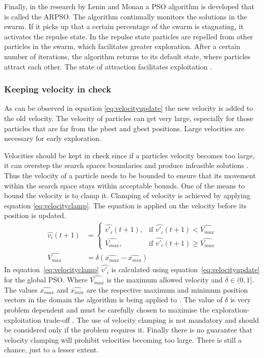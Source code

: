 Finally, in the research by Lenin and Monan a \gls{PSO} algorithm is developed that is called the \gls{ARPSO}. The algorithm continually monitors the solutions in the swarm. If it picks up that a certain percentage of the swarm is stagnating, it activates the repulse state. In the repulse state particles are repelled from other particles in the swarm, which facilitates greater exploration. After a certain number of iterations, the algorithm returns to its default state, where particles attract each other. The state of attraction facilitates exploitation \cite{PSOAttractRepulse}.
\subsubsection{Keeping velocity in check}
As can be observed in equation \ref{eq:velocityupdate} the new velocity is added to the old velocity. The velocity of particles can get very large, especially for those particles that are far from the pbest and gbest positions. Large velocities are necessary for early exploration. 

Velocities should be kept in check since if a particles velocity becomes too large, it can overstep the search spaces boundaries and produce infeasible solutions \cite{FundamentalSwarm}. Thus the velocity of a particle needs to be bounded to ensure that its movement within the search space stays within acceptable bounds. One of the means to bound the velocity is to clamp it. Clamping of velocity is achieved by applying equation \ref{eq:velocityclamp}. The equation is applied on the velocity before its position is updated\cite{FundamentalSwarm}.
\begin{align}
	\hat{v_i}(t+1) &=
	\begin{cases}
	\hat{v'_i}(t+1), &\text{if $\hat{v'_i}(t+1) < \hat{V_{max}}$}\\
	\hat{V_{max}}, &\text{if $\hat{v'_i}(t+1) \geq \hat{V_{max}}$}
	\end{cases} \label{eq:velocityclamp}\\
	\hat{V_{max}} &= \delta(\hat{x_{max}} - \hat{x_{min}})
\end{align}
In equation~\ref{eq:velocityclamp} $\hat{v'_i}$ is calculated using equation~\ref{eq:velocityupdate} for the global \gls{PSO}. Where $\hat{V_{max}}$ is the maximum allowed velocity and $\delta \in (0,1]$. The values $\hat{x_{max}}$ and $\hat{x_{min}}$ are the respective maximum and minimum position vectors in the domain the algorithm is being applied to \cite{FundamentalSwarm}. The value of $\delta$ is very problem dependent and must be carefully chosen to maximise the exploration-exploitation trade-off \cite{FundamentalSwarm}. The use of velocity clamping is not mandatory and should be considered only if the problem requires it\cite{FundamentalSwarm}. Finally there is no guarantee that velocity clamping will prohibit velocities becoming too large\cite{FundamentalSwarm}. There is still a chance, just to a lesser extent\cite{FundamentalSwarm}.

